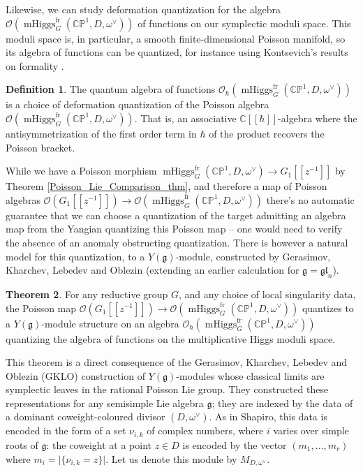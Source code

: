 \documentclass[11pt, oneside, reqno]{amsart}
\theoremstyle{definition} \newtheorem{definition}{Definition}[section]
\newtheorem{theorem}[definition]{Theorem}
\theoremstyle{definition} \newtheorem{remark}[definition]{Remark}
\theoremstyle{definition} \newtheorem{remarks}[definition]{Remarks}
\theoremstyle{definition} \newtheorem{question}[definition]{Question}
\theoremstyle{definition} \newtheorem*{note}{Note}
\theoremstyle{definition} \newtheorem{example}[definition]{Example}
\theoremstyle{definition} \newtheorem{examples}[definition]{Examples}
\renewcommand{\gg}{\mathfrak{g}}
\newcommand{\bb}[1]{\mathbb{#1}}
\newcommand{\CC}{\mathbb{C}}
\newcommand{\OO}{\mathcal{O}}
\newcommand{\gl}{\mathfrak{gl}}
\DeclareMathOperator{\mhiggs}{mHiggs}
\newcommand{\fr}{\mathrm{fr}}
\begin{document}
Likewise, we can study deformation quantization for the algebra $\OO(\mhiggs^\fr_G(\bb{CP}^1,D,\omega^\vee))$ of functions on our symplectic moduli space.  This moduli space is, in particular, a smooth finite-dimensional Poisson manifold, so its algebra of functions can be quantized, for instance using Kontsevich's results on formality \cite{KontsevichQuantization}.

\begin{definition}
The quantum algebra of functions $\OO_\hbar(\mhiggs^\fr_G(\bb{CP}^1,D,\omega^\vee))$ is a choice of deformation quantization of the Poisson algebra $\OO(\mhiggs^\fr_G(\bb{CP}^1,D,\omega^\vee))$.  That is, an associative $\CC[[\hbar]]$-algebra where the antisymmetrization of the first order term in $\hbar$ of the product recovers the Poisson bracket. 
\end{definition}

While we have a Poisson morphism $\mhiggs^\fr_G(\bb{CP}^1,D,\omega^\vee) \to G_1[[z^{-1}]]$ by Theorem \ref{Poisson_Lie_Comparison_thm}, and therefore a map of Poisson algebras $\OO(G_1[[z^{-1}]]) \to \OO(\mhiggs^\fr_G(\bb{CP}^1,D,\omega^\vee))$ there's no automatic guarantee that we can choose a quantization of the target admitting an algebra map from the Yangian quantizing this Poisson map -- one would need to verify the absence of an anomaly obstructing quantization.  There is however a natural model for this quantization, to a $Y(\gg)$-module,  constructed by Gerasimov, Kharchev, Lebedev and Oblezin \cite{GKLO} (extending an earlier calculation \cite{GKL} for $\gg = \gl_n$).

\begin{theorem}
For any reductive group $G$, and any choice of local singularity data, the Poisson map $\OO(G_1[[z^{-1}]]) \to \OO(\mhiggs^\fr_G(\bb{CP}^1,D,\omega^\vee))$ quantizes to a $Y(\gg)$-module structure on an algebra $\OO_\hbar(\mhiggs^\fr_G(\bb{CP}^1,D,\omega^\vee))$ quantizing the algebra of functions on the multiplicative Higgs moduli space.  
\end{theorem}

This theorem is a direct consequence of the Gerasimov, Kharchev, Lebedev and Oblezin (GKLO) construction of $Y(\gg)$-modules whose classical limits are symplectic leaves in the rational Poisson Lie group.  They constructed these representations for any semisimple Lie algebra $\gg$; they are indexed by the data of a dominant coweight-coloured divisor $(D, \omega^\vee)$.  As in Shapiro, this data is encoded in the form of a set $\nu_{i,k}$ of complex numbers, where $i$ varies over simple roots of $\gg$: the coweight at a point $z \in D$ is encoded by the vector $(m_1, \ldots, m_r)$ where $m_i = \lvert\{\nu_{i,k} = z\}\rvert$.  Let us denote this module by $M_{D,\omega^\vee}$.
\end{document}

